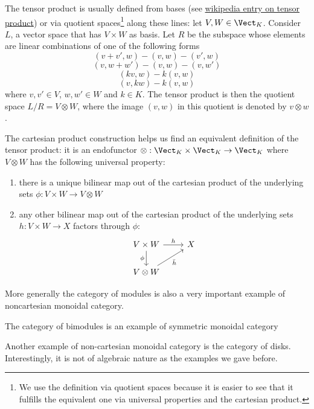 \begin{defn}
    The tensor product is usually defined from bases (see \hyperlink{https://en.wikipedia.org/wiki/Tensor_product}{wikipedia entry on tensor product}) or via quotient spaces\footnote{We use the definition via quotient spaces because it is easier to see that it fulfills the equivalent one via universal properties and the cartesian product.} along these lines: let $V,W\in \Vect_K$. Consider $L$, a vector space that has $V\times W$ as basis. Let $R$ be the subspace whose elements are linear combinations of one of the following forms
    $$(v+v',w)-(v,w)-(v',w)$$
    $$(v,w+w')-(v,w)-(v,w')$$
    $$(kv,w)-k(v,w)$$
    $$(v,kw)-k(v,w)$$
    where $v,v'\in V$, $w,w'\in W$ and $k\in K$. The tensor product is then the quotient space $L/R=V\otimes W$, where the image $(v,w)$ in this quotient is denoted by $v\otimes w$.

   \noindent The cartesian product construction helps us find an equivalent definition of the tensor product: it is an endofunctor $\otimes:\Vect_K\times\Vect_K\to\Vect_K$ where $V\otimes W$ has the following universal property: 
   \begin{enumerate}
       \item there is a unique bilinear map out of the cartesian product of the underlying sets $\phi:V\times W\to V\otimes W$
       \item any other bilinear map out of the cartesian product of the underlying sets $h:V\times W\to X$ factors through $\phi$:%
        \[\begin{tikzcd}
            {V\times W} & X \\
            {V\otimes W}
            \arrow["\phi"', from=1-1, to=2-1]
            \arrow["{\bar{h}}"', from=2-1, to=1-2]
            \arrow["h", from=1-1, to=1-2]
        \end{tikzcd}\]
   \end{enumerate}
\end{defn}
More generally the category of modules is also a very important example of noncartesian monoidal category.
\begin{defn}[Module]\label{CatOfModules}
    
\end{defn}
\begin{ex}
    The category of bimodules is an example of symmetric monoidal category
    \begin{defn}[Bimodule]\label{CatOfBimodules}
        
    \end{defn}
\end{ex}
Another example of non-cartesian monoidal category is the category of disks. Interestingly, it 
is not of algebraic nature as the examples we gave before.

